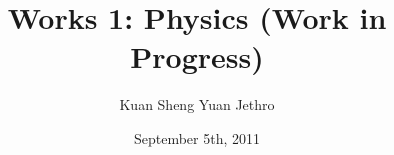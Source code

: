 

 
\setcounter{secnumdepth}{2}
\author{Kuan Sheng Yuan Jethro}
\date{September 5th, 2011}
\title{Works 1: Physics (Work in Progress)}
\maketitle

\setcounter{tocdepth}{2}
\tableofcontents























